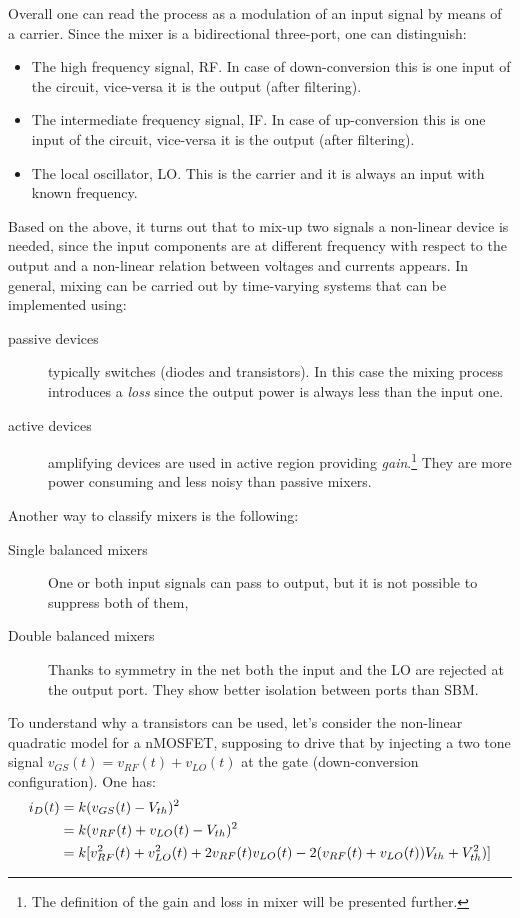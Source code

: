 Overall one can read the process as a modulation of an input signal by means of a carrier.  Since the mixer is a bidirectional three-port, one can distinguish: 
\begin{itemize}
	\item The high frequency signal, RF. In case of down-conversion this is one input of the circuit, vice-versa it is the output (after filtering).
	\item The intermediate frequency signal, IF. In case of up-conversion this is one input of the circuit, vice-versa it is the output (after filtering).
	\item The local oscillator, LO. This is the carrier and it is always an input with known frequency.
\end{itemize}

Based on the above, it turns out that to mix-up two signals a non-linear device is needed, since the input components are at different frequency with respect to the output and a non-linear relation between voltages and currents appears. In general, mixing can be carried out by time-varying systems that can be implemented using:
\begin{description}
	\item [passive devices]	typically switches (diodes and transistors). In this case the mixing process introduces a \emph{loss} since the output power is always less than the input one.
	\item [active devices] amplifying devices are used in active region providing \emph{gain}.\footnote{The definition of the gain and loss in mixer will be presented further.} They are more power consuming and less noisy than passive mixers.
\end{description}
Another way to classify mixers is the following:
\begin{description}
	\item [Single balanced mixers] One or both input signals can pass to output, but it is not possible to suppress both of them,
	\item [Double balanced mixers] Thanks to symmetry in the net both the input and the LO are rejected at the output port. They show better isolation between ports than SBM. 
\end{description}
To understand why a transistors can be used, let's consider the non-linear quadratic model for a nMOSFET, supposing to drive that by injecting a two tone signal $v_{GS}(t)=v_{RF}(t)+v_{LO}(t)$ at the gate (down-conversion configuration). One has:
\begin{align}
i_D(t) &= k(v_{GS}(t)-V_{th})^2 \notag \\
& = k(v_{RF}(t)+v_{LO}(t)-V_{th})^2 \notag \\
& = k[v_{RF}^2(t)+v_{LO}^2(t)+2v_{RF}(t)v_{LO}(t)-2(v_{RF}(t)+v_{LO}(t))V_{th}+V_{th}^2)] \notag
\end{align}
